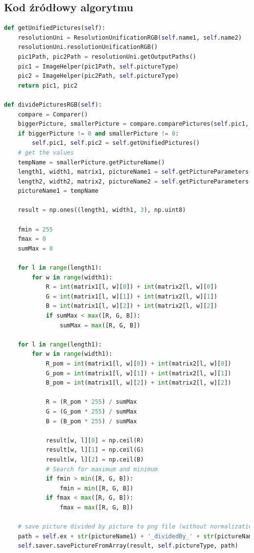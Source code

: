 \documentclass[a4paper,12pt, titlepage]{report}
\begin{document}
\subsection*{Kod źródłowy algorytmu}
\begin{lstlisting}[language=Python]
def getUnifiedPictures(self):
    resolutionUni = ResolutionUnificationRGB(self.name1, self.name2)
    resolutionUni.resolutionUnificationRGB()
    pic1Path, pic2Path = resolutionUni.getOutputPaths()
    pic1 = ImageHelper(pic1Path, self.pictureType)
    pic2 = ImageHelper(pic2Path, self.pictureType)
    return pic1, pic2

def dividePicturesRGB(self):
    compare = Comparer()
    biggerPicture, smallerPicture = compare.comparePictures(self.pic1, self.pic2)
    if biggerPicture != 0 and smallerPicture != 0:
        self.pic1, self.pic2 = self.getUnifiedPictures()
    # get the values
    tempName = smallerPicture.getPictureName()
    length1, width1, matrix1, pictureName1 = self.getPictureParameters(self.pic1)
    length2, width2, matrix2, pictureName2 = self.getPictureParameters(self.pic2)
    pictureName1 = tempName

    result = np.ones((length1, width1, 3), np.uint8)

    fmin = 255
    fmax = 0
    sumMax = 0

    for l in range(length1):
        for w in range(width1):
            R = int(matrix1[l, w][0]) + int(matrix2[l, w][0])
            G = int(matrix1[l, w][1]) + int(matrix2[l, w][1])
            B = int(matrix1[l, w][2]) + int(matrix2[l, w][2])
            if sumMax < max([R, G, B]):
                sumMax = max([R, G, B])

    for l in range(length1):
        for w in range(width1):
            R_pom = int(matrix1[l, w][0]) + int(matrix2[l, w][0])
            G_pom = int(matrix1[l, w][1]) + int(matrix2[l, w][1])
            B_pom = int(matrix1[l, w][2]) + int(matrix2[l, w][2])

            R = (R_pom * 255) / sumMax
            G = (G_pom * 255) / sumMax
            B = (B_pom * 255) / sumMax

            result[w, l][0] = np.ceil(R)
            result[w, l][1] = np.ceil(G)
            result[w, l][2] = np.ceil(B)
            # Search for maximum and minimum
            if fmin > min([R, G, B]):
                fmin = min([R, G, B])
            if fmax < max([R, G, B]):
                fmax = max([R, G, B])

    # save picture divided by picture to png file (without normalization)
    path = self.ex + str(pictureName1) + '_dividedBy_' + str(pictureName2) + '.png'
    self.saver.savePictureFromArray(result, self.pictureType, path)


\end{lstlisting}
\end{document}
